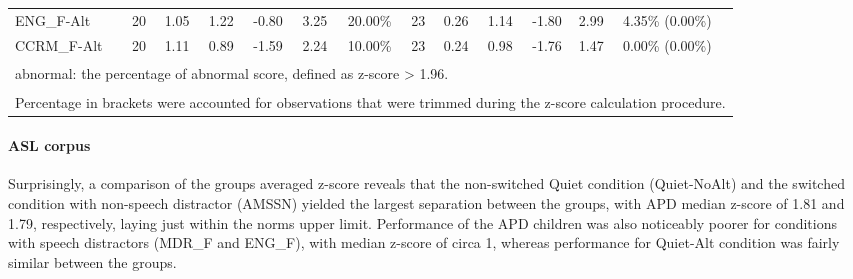 \documentclass[a4paper, twoside]{templates/ociamthesis}
\begin{document}
\begin{table}
{\begin{tabular}[t]{lcccccc|>{}ccccll}
\hspace{1em}ENG\_F-Alt & 20 & 1.05 & 1.22 & -0.80 & 3.25 & 20.00\% & 23 & 0.26 & 1.14 & -1.80 & 2.99 & 4.35\% (0.00\%)\\
\hspace{1em}CCRM\_F-Alt & 20 & 1.11 & 0.89 & -1.59 & 2.24 & 10.00\% & 23 & 0.24 & 0.98 & -1.76 & 1.47 & 0.00\% (0.00\%)\\
\bottomrule
\multicolumn{13}{l}{\textsuperscript{} abnormal: the percentage of abnormal score, defined as z-score > 1.96.}\\
\multicolumn{13}{l}{\textsuperscript{} Percentage in brackets were accounted for observations that were trimmed during the z-score calculation procedure.}\\
\end{tabular}}
\end{table}

\hypertarget{asl-corpus}{%
\paragraph*{ASL corpus}\label{asl-corpus}}

Surprisingly, a comparison of the groups averaged z-score reveals that the non-switched Quiet condition (Quiet-NoAlt) and the switched condition with non-speech distractor (AMSSN) yielded the largest separation between the groups, with APD median z-score of 1.81 and 1.79, respectively, laying just within the norms upper limit. Performance of the APD children was also noticeably poorer for conditions with speech distractors (MDR\_F and ENG\_F), with median z-score of circa 1, whereas performance for Quiet-Alt condition was fairly similar between the groups.
\end{document}
